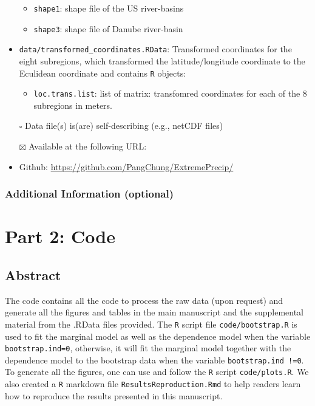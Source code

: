 \documentclass[
]{article}
\providecommand{\tightlist}{%
  \setlength{\itemsep}{0pt}\setlength{\parskip}{0pt}}
\begin{document}
\begin{itemize}
  \begin{itemize}
  \tightlist
  \item
    \texttt{shape1}: shape file of the US river-basins
  \item
    \texttt{shape3}: shape file of Danube river-basin
  \end{itemize}
\item
  \texttt{data/transformed\_coordinates.RData}: Transformed coordinates
  for the eight subregions, which transformed the latitude/longitude
  coordinate to the Eculidean coordinate and contains \texttt{R}
  objects:

  \begin{itemize}
  \tightlist
  \item
    \texttt{loc.trans.list}: list of matrix: transfomred coordinates for
    each of the 8 subregions in meters.
  \end{itemize}
\item[$\square$]
  Data file(s) is(are) self-describing (e.g., netCDF files)
\item[$\boxtimes$]
  Available at the following URL:
\item
  Github: \url{https://github.com/PangChung/ExtremePrecip/}
\end{itemize}

\subsubsection{Additional Information
(optional)}\label{additional-information-optional}

\section{Part 2: Code}\label{part-2-code}

\subsection{Abstract}\label{abstract-1}

The code contains all the code to process the raw data (upon request)
and generate all the figures and tables in the main manuscript and the
supplemental material from the .RData files provided. The \texttt{R}
script file \texttt{code/bootstrap.R} is used to fit the marginal model
as well as the dependence model when the variable
\texttt{bootstrap.ind=0}, otherwise, it will fit the marginal model
together with the dependence model to the bootstrap data when the
variable \texttt{bootstrap.ind\ !=0}. To generate all the figures, one
can use and follow the \texttt{R} script \texttt{code/plots.R}. We also
created a \texttt{R} markdown file \texttt{ResultsReproduction.Rmd} to
help readers learn how to reproduce the results presented in this
manuscript.
\end{document}
